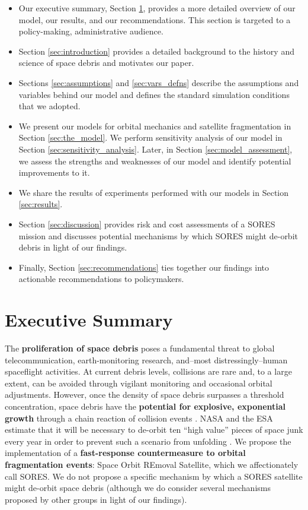 \documentclass[12pt]{scrartcl}
\begin{document}
\begin{itemize}
    \item Our executive summary, Section \ref{sec:executive_summary}, provides a more detailed overview of our model, our results, and our recommendations. This section is targeted to a policy-making, administrative audience.
    \item Section \ref{sec:introduction} provides a detailed background to the history and science of space debris and motivates our paper.
    \item Sections \ref{sec:assumptions} and \ref{sec:vars_defns} describe the assumptions and variables behind our model and defines the standard simulation conditions that we adopted.
    \item We present our models for orbital mechanics and satellite fragmentation in Section \ref{sec:the_model}. We perform sensitivity analysis of our model in Section \ref{sec:sensitivity_analysis}. Later, in Section \ref{sec:model_assessment}, we assess the strengths and weaknesses of our model and identify potential improvements to it.
    \item We share the results of experiments performed with our models in Section \ref{sec:results}. 
    \item Section \ref{sec:discussion} provides risk and cost assessments of a SORES mission and discusses potential mechanisms by which SORES might de-orbit debris in light of our findings.
    \item Finally, Section \ref{sec:recommendations} ties together our findings into actionable recommendations to policymakers. 
\end{itemize}

\section{Executive Summary} \label{sec:executive_summary}
The \textbf{proliferation of space debris} poses a fundamental threat to global telecommunication, earth-monitoring research, and--most distressingly--human spaceflight activities. At current debris levels, collisions are rare and, to a large extent, can be avoided through vigilant monitoring and occasional orbital adjustments. However, once the density of space debris surpasses a threshold concentration, space debris have the \textbf{potential for explosive, exponential growth} through a chain reaction of collision events \cite{1995 IA}. NASA and the ESA estimate that it will be necessary to de-orbit ten ``high value'' pieces of space junk every year in order to prevent such a scenario from unfolding \cite{ESA}. We propose the implementation of a \textbf{fast-response countermeasure to orbital fragmentation events}: Space Orbit REmoval Satellite, which we affectionately call SORES. We do not propose a specific mechanism by which a SORES satellite might de-orbit space debris (although we do consider several mechanisms proposed by other groups in light of our findings).
\end{document}
